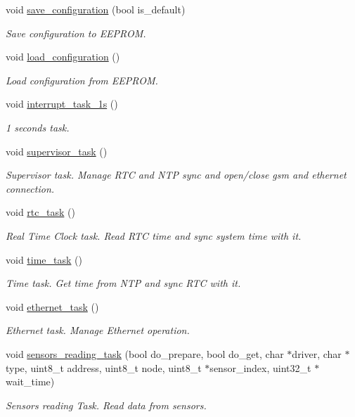 \begin{DoxyCompactItemize}
void \hyperlink{rmap_8ino_afa979a8cb238fe81bf20654dfd6096ef}{save\+\_\+configuration} (bool is\+\_\+default)
\begin{DoxyCompactList}\small\item\em Save configuration to E\+E\+P\+R\+OM. \end{DoxyCompactList}\item 
void \hyperlink{rmap_8ino_a32a64a2800c724fb28e10636f2ec20b9}{load\+\_\+configuration} ()
\begin{DoxyCompactList}\small\item\em Load configuration from E\+E\+P\+R\+OM. \end{DoxyCompactList}\item 
void \hyperlink{rmap_8ino_ab4f6973c82c5b3199823df3ae91abbda}{interrupt\+\_\+task\+\_\+1s} ()
\begin{DoxyCompactList}\small\item\em 1 seconds task. \end{DoxyCompactList}\item 
void \hyperlink{rmap_8ino_a2f44f14407ed3f1ae93126c1533e697b}{supervisor\+\_\+task} ()
\begin{DoxyCompactList}\small\item\em Supervisor task. Manage R\+TC and N\+TP sync and open/close gsm and ethernet connection. \end{DoxyCompactList}\item 
void \hyperlink{rmap_8ino_a52f7fb7ebbd710f2a06b3f6e47c7e7e3}{rtc\+\_\+task} ()
\begin{DoxyCompactList}\small\item\em Real Time Clock task. Read R\+TC time and sync system time with it. \end{DoxyCompactList}\item 
void \hyperlink{rmap_8ino_a35c29025c5ef3d135b8c2b038be3f8df}{time\+\_\+task} ()
\begin{DoxyCompactList}\small\item\em Time task. Get time from N\+TP and sync R\+TC with it. \end{DoxyCompactList}\item 
void \hyperlink{rmap_8ino_abac8959915b759aa6429243ab9599ee3}{ethernet\+\_\+task} ()
\begin{DoxyCompactList}\small\item\em Ethernet task. Manage Ethernet operation. \end{DoxyCompactList}\item 
void \hyperlink{rmap_8ino_a77e801165d14454a2cfb2844c7b9f088}{sensors\+\_\+reading\+\_\+task} (bool do\+\_\+prepare, bool do\+\_\+get, char $\ast$driver, char $\ast$type, uint8\+\_\+t address, uint8\+\_\+t node, uint8\+\_\+t $\ast$sensor\+\_\+index, uint32\+\_\+t $\ast$wait\+\_\+time)
\begin{DoxyCompactList}\small\item\em Sensors reading Task. Read data from sensors. \end{DoxyCompactList}\end{DoxyCompactItemize}


